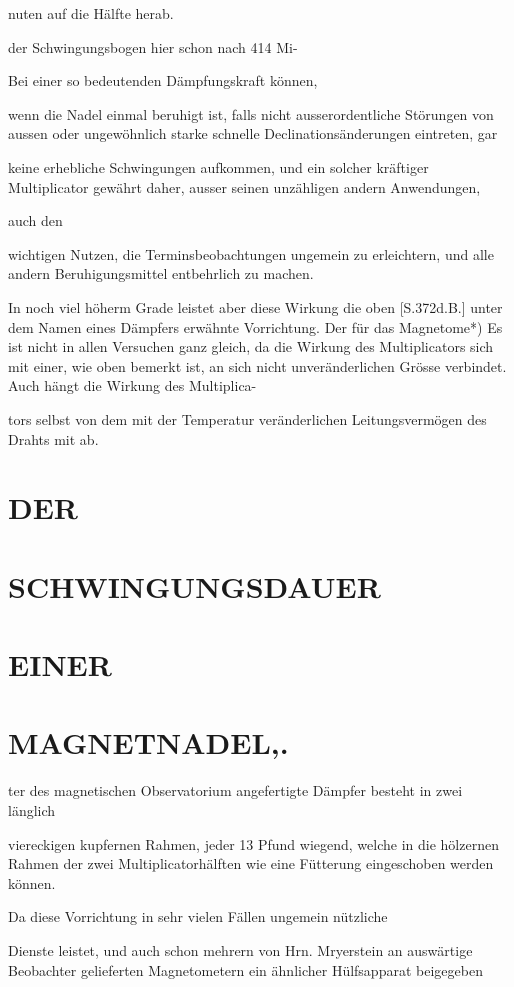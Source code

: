 \documentclass[12pt,a4paper]{article}
\begin{document}
nuten auf die Hälfte herab.

der Schwingungsbogen hier schon nach 414 Mi-

Bei einer so bedeutenden Dämpfungskraft können,

wenn die Nadel einmal beruhigt ist, falls nicht ausserordentliche Störungen von aussen oder ungewöhnlich starke schnelle Declinationsänderungen eintreten, gar

keine erhebliche Schwingungen aufkommen, und ein solcher kräftiger Multiplicator gewährt daher, ausser seinen unzähligen andern Anwendungen,

auch den

wichtigen Nutzen, die Terminsbeobachtungen ungemein zu erleichtern, und alle andern Beruhigungsmittel entbehrlich zu machen.

In noch viel höherm Grade leistet aber diese Wirkung die oben [S.372d.B.] unter dem Namen eines Dämpfers erwähnte Vorrichtung. Der für das Magnetome*) Es ist nicht in allen Versuchen ganz gleich, da die Wirkung des Multiplicators sich mit einer, wie oben bemerkt ist, an sich nicht unveränderlichen Grösse verbindet. Auch hängt die Wirkung des Multiplica-

tors selbst von dem mit der Temperatur veränderlichen Leitungsvermögen des Drahts mit ab.

\section*{DER}
\section*{SCHWINGUNGSDAUER}
\section*{EINER}
\section*{MAGNETNADEL,.}
ter des magnetischen Observatorium angefertigte Dämpfer besteht in zwei länglich

viereckigen kupfernen Rahmen, jeder 13 Pfund wiegend, welche in die hölzernen Rahmen der zwei Multiplicatorhälften wie eine Fütterung eingeschoben werden können.

Da diese Vorrichtung in sehr vielen Fällen ungemein nützliche

Dienste leistet, und auch schon mehrern von Hrn. Mryerstein an auswärtige Beobachter gelieferten Magnetometern ein ähnlicher Hülfsapparat beigegeben
\end{document}
